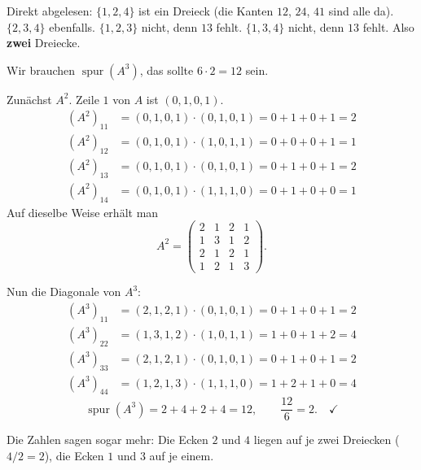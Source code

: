 \begin{aufgabe}
Direkt abgelesen: $\{1,2,4\}$ ist ein Dreieck (die Kanten $12$, $24$, $41$ sind alle da). $\{2,3,4\}$ ebenfalls. $\{1,2,3\}$ nicht, denn $13$ fehlt. $\{1,3,4\}$ nicht, denn $13$ fehlt. Also \textbf{zwei} Dreiecke.

Wir brauchen $\operatorname{spur}(A^3)$, das sollte $6 \cdot 2 = 12$ sein.

Zunächst $A^2$. Zeile $1$ von $A$ ist $(0,1,0,1)$.
\begin{align*}
(A^2)_{11} &= (0,1,0,1)\cdot(0,1,0,1) = 0+1+0+1 = 2\\
(A^2)_{12} &= (0,1,0,1)\cdot(1,0,1,1) = 0+0+0+1 = 1\\
(A^2)_{13} &= (0,1,0,1)\cdot(0,1,0,1) = 0+1+0+1 = 2\\
(A^2)_{14} &= (0,1,0,1)\cdot(1,1,1,0) = 0+1+0+0 = 1
\end{align*}
Auf dieselbe Weise erhält man
\[ A^2 = \begin{pmatrix} 2 & 1 & 2 & 1 \\ 1 & 3 & 1 & 2 \\ 2 & 1 & 2 & 1 \\ 1 & 2 & 1 & 3 \end{pmatrix}. \]

Nun die Diagonale von $A^3$:
\begin{align*}
(A^3)_{11} &= (2,1,2,1)\cdot(0,1,0,1) = 0+1+0+1 = 2\\
(A^3)_{22} &= (1,3,1,2)\cdot(1,0,1,1) = 1+0+1+2 = 4\\
(A^3)_{33} &= (2,1,2,1)\cdot(0,1,0,1) = 0+1+0+1 = 2\\
(A^3)_{44} &= (1,2,1,3)\cdot(1,1,1,0) = 1+2+1+0 = 4
\end{align*}
\[ \operatorname{spur}(A^3) = 2+4+2+4 = 12, \qquad \frac{12}{6} = 2 . \quad \checkmark \]

Die Zahlen sagen sogar mehr: Die Ecken $2$ und $4$ liegen auf je zwei Dreiecken ($4/2 = 2$), die Ecken $1$ und $3$ auf je einem.
\end{aufgabe}

